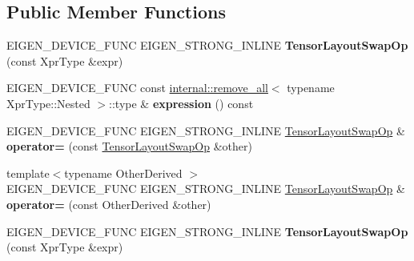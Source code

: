 \subsection*{Public Member Functions}
\begin{DoxyCompactItemize}
\item 
\mbox{\label{class_eigen_1_1_tensor_layout_swap_op_abfd07d8b2756bbc6b8b9b33465658641}} 
E\+I\+G\+E\+N\+\_\+\+D\+E\+V\+I\+C\+E\+\_\+\+F\+U\+NC E\+I\+G\+E\+N\+\_\+\+S\+T\+R\+O\+N\+G\+\_\+\+I\+N\+L\+I\+NE {\bfseries Tensor\+Layout\+Swap\+Op} (const Xpr\+Type \&expr)
\item 
\mbox{\label{class_eigen_1_1_tensor_layout_swap_op_a0cb5a25065f61d8de7719da2089ff4eb}} 
E\+I\+G\+E\+N\+\_\+\+D\+E\+V\+I\+C\+E\+\_\+\+F\+U\+NC const \hyperlink{struct_eigen_1_1internal_1_1remove__all}{internal\+::remove\+\_\+all}$<$ typename Xpr\+Type\+::\+Nested $>$\+::type \& {\bfseries expression} () const
\item 
\mbox{\label{class_eigen_1_1_tensor_layout_swap_op_a44052f6178184362720fbf14b9011651}} 
E\+I\+G\+E\+N\+\_\+\+D\+E\+V\+I\+C\+E\+\_\+\+F\+U\+NC E\+I\+G\+E\+N\+\_\+\+S\+T\+R\+O\+N\+G\+\_\+\+I\+N\+L\+I\+NE \hyperlink{class_eigen_1_1_tensor_layout_swap_op}{Tensor\+Layout\+Swap\+Op} \& {\bfseries operator=} (const \hyperlink{class_eigen_1_1_tensor_layout_swap_op}{Tensor\+Layout\+Swap\+Op} \&other)
\item 
\mbox{\label{class_eigen_1_1_tensor_layout_swap_op_af35a0c897fc4ba261b73ebec5a1074db}} 
{\footnotesize template$<$typename Other\+Derived $>$ }\\E\+I\+G\+E\+N\+\_\+\+D\+E\+V\+I\+C\+E\+\_\+\+F\+U\+NC E\+I\+G\+E\+N\+\_\+\+S\+T\+R\+O\+N\+G\+\_\+\+I\+N\+L\+I\+NE \hyperlink{class_eigen_1_1_tensor_layout_swap_op}{Tensor\+Layout\+Swap\+Op} \& {\bfseries operator=} (const Other\+Derived \&other)
\item 
\mbox{\label{class_eigen_1_1_tensor_layout_swap_op_abfd07d8b2756bbc6b8b9b33465658641}} 
E\+I\+G\+E\+N\+\_\+\+D\+E\+V\+I\+C\+E\+\_\+\+F\+U\+NC E\+I\+G\+E\+N\+\_\+\+S\+T\+R\+O\+N\+G\+\_\+\+I\+N\+L\+I\+NE {\bfseries Tensor\+Layout\+Swap\+Op} (const Xpr\+Type \&expr)
\item 

\end{DoxyCompactItemize}
